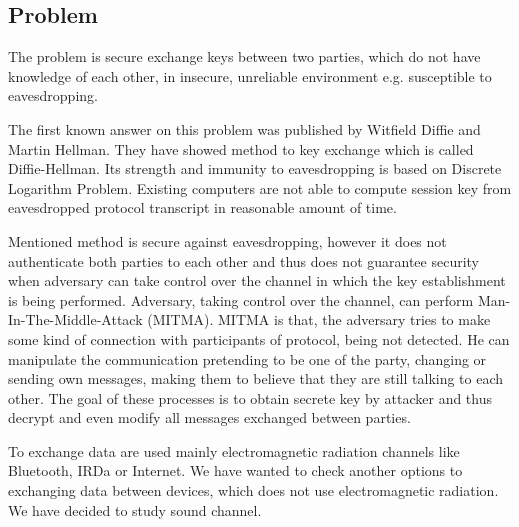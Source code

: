 \documentclass[11pt,titlepage]{article}
\theoremstyle{plain}
\begin{document}
\subsection{Problem}

The problem is secure exchange keys between two parties, which do not have knowledge of each other, in insecure, unreliable environment e.g. susceptible to eavesdropping.

\vspace{5mm}

The first known answer on this problem was published by Witfield Diffie and Martin Hellman. They have showed method to key exchange which is called Diffie-Hellman. Its strength and immunity to eavesdropping is based on Discrete Logarithm Problem. Existing computers are not able to compute session key from eavesdropped protocol transcript in reasonable amount of time.

\vspace{5mm}

Mentioned method is secure against eavesdropping, however it does not authenticate both parties to each other and thus does not guarantee security when adversary can take control over the channel in which the key establishment is being performed. Adversary, taking control over the channel, can perform Man-In-The-Middle-Attack (MITMA). MITMA is that, the adversary tries to make some kind of connection with participants of protocol, being not detected. He can manipulate the communication pretending to be one of the party, changing or sending own messages, making them to believe that they are still talking to each other. The goal of these processes is to obtain secrete key by attacker and thus decrypt and even modify all messages exchanged between parties.

\vspace{5mm}

To exchange data are used mainly electromagnetic radiation channels like Bluetooth, IRDa or Internet. We have wanted to check another options to exchanging data between devices, which does not use electromagnetic radiation. We have decided to study sound channel.







\end{document}
